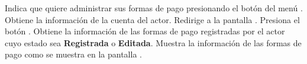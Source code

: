 	\begin{UCtrayectoria}
		\UCpaso[\UCactor] Indica que quiere administrar sus formas de pago presionando el botón  del menú .
		\UCpaso Obtiene la información de la cuenta del actor.
		\UCpaso Redirige a la pantalla .
		\UCpaso[\UCactor] Presiona el botón .
		\UCpaso Obtiene la información de las formas de pago registradas por el actor cuyo estado sea \textbf{Registrada} o \textbf{Editada}.
		\UCpaso \label{CUMP2.1:Fin}Muestra la información de las formas de pago como se muestra en la pantalla .
	\end{UCtrayectoria}
	
	
	